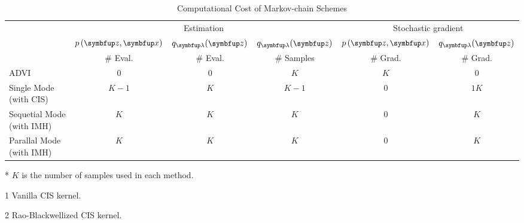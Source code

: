 
\begin{table*}
\centering
\caption{Computational Cost of Markov-chain Schemes}\label{table:cost}
\setlength{\tabcolsep}{2pt}
  \begin{threeparttable}
\begin{tabular}{lccccc}\toprule
& \multicolumn{3}{c}{\footnotesize Estimation} & \multicolumn{2}{c}{\footnotesize Stochastic gradient} \\
\cmidrule(lr){2-4}\cmidrule(lr){5-6}
  & \(\footnotesize p\left( \vz, \vx \right)\)
  & \(\footnotesize q_{\vlambda}(\vz)\)
  & \(\footnotesize q_{\vlambda}(\vz)\)
  & \(\footnotesize p\left( \vz, \vx \right)\)
  & \(\footnotesize q_{\vlambda}(\vz)\)
  \\
  & {\footnotesize\# Eval.  }
  & {\footnotesize\# Eval.  }
  & {\footnotesize\# Samples}
  & {\footnotesize\# Grad.  }
  & {\footnotesize\# Grad.  }
%
\\\midrule
%
{\footnotesize
ADVI
}
& \(0\)
& \(0\)
& \(K\)
& \(K\)
& \(0\)
\\\arrayrulecolor{black!30}\midrule
%
{\footnotesize
Single Mode (with CIS)
}
& \(K-1\)
& \(K\)
& \(K-1\)
& \(0\)
& \(1\)\tnote{1}\;{\footnotesize or}\;\(K\)\tnote{2}
\\
%
{\footnotesize
Sequetial Mode (with IMH)
}
& \(K\)
& \(K\)
& \(K\)
& \(0\)
& \(K\)
\\
%
{\footnotesize
Parallal Mode (with IMH)
}
& \(K\)
& \(K\)
& \(K\)
& \(0\)
& \(K\)
\\\bottomrule
\end{tabular}
  \begin{tablenotes}
    \item[*]{\footnotesize \(K\) is the number of samples used in each method}.
    \item[1]{\footnotesize Vanilla CIS kernel}.
    \item[2]{\footnotesize Rao-Blackwellized CIS kernel}.
  \end{tablenotes}
  \end{threeparttable}
\end{table*}
